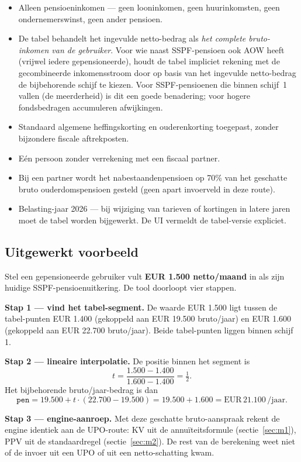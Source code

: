 \documentclass[11pt,a4paper]{article}
\newcommand{\code}[1]{\texttt{#1}}
\begin{document}
\begin{itemize}
\item Alleen pensioeninkomen --- geen looninkomen, geen huurinkomsten, geen ondernemerswinst, geen ander pensioen.
\item De tabel behandelt het ingevulde netto-bedrag als \emph{het complete bruto-inkomen van de gebruiker}. Voor wie naast SSPF-pensioen ook AOW heeft (vrijwel iedere gepensioneerde), houdt de tabel impliciet rekening met de gecombineerde inkomensstroom door op basis van het ingevulde netto-bedrag de bijbehorende schijf te kiezen. Voor SSPF-pensioenen die binnen schijf~1 vallen (de meerderheid) is dit een goede benadering; voor hogere fondsbedragen accumuleren afwijkingen.
\item Standaard algemene heffingskorting en ouderenkorting toegepast, zonder bijzondere fiscale aftrekposten.
\item Eén persoon zonder verrekening met een fiscaal partner.
\item Bij een partner wordt het nabestaandenpensioen op 70\% van het geschatte bruto ouderdomspensioen gesteld (geen apart invoerveld in deze route).
\item Belasting-jaar 2026 --- bij wijziging van tarieven of kortingen in latere jaren moet de tabel worden bijgewerkt. De UI vermeldt de tabel-versie expliciet.
\end{itemize}

\subsection{Uitgewerkt voorbeeld}
\label{sec:netto-voorbeeld}

Stel een gepensioneerde gebruiker vult \textbf{EUR 1.500 netto/maand} in als zijn huidige SSPF-pensioenuitkering. De tool doorloopt vier stappen.

\textbf{Stap 1 --- vind het tabel-segment.} De waarde EUR 1.500 ligt tussen de tabel-punten EUR 1.400 (gekoppeld aan EUR 19.500 bruto/jaar) en EUR 1.600 (gekoppeld aan EUR 22.700 bruto/jaar). Beide tabel-punten liggen binnen schijf 1.

\textbf{Stap 2 --- lineaire interpolatie.} De positie binnen het segment is
\[
t = \frac{1.500 - 1.400}{1.600 - 1.400} = \tfrac{1}{2}.
\]
Het bijbehorende bruto/jaar-bedrag is dan
\[
\code{pen} = 19.500 + t \cdot (22.700 - 19.500) = 19.500 + 1.600 = \text{EUR}\,21.100\,/\text{jaar}.
\]

\textbf{Stap 3 --- engine-aanroep.} Met deze geschatte bruto-aanspraak rekent de engine identiek aan de UPO-route: KV uit de annuïteitsformule (sectie~\ref{sec:m1}), PPV uit de standaardregel (sectie~\ref{sec:m2}). De rest van de berekening weet niet of de invoer uit een UPO of uit een netto-schatting kwam.
\end{document}
